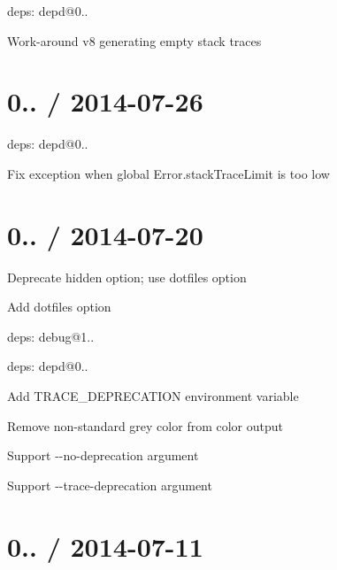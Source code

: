 \begin{DoxyItemize}
\item deps\+: depd@0..
\begin{DoxyItemize}
\item Work-\/around v8 generating empty stack traces
\end{DoxyItemize}
\end{DoxyItemize}

\section*{0.. / 2014-\/07-\/26 }


\begin{DoxyItemize}
\item deps\+: depd@0..
\begin{DoxyItemize}
\item Fix exception when global {\ttfamily Error.\+stack\+Trace\+Limit} is too low
\end{DoxyItemize}
\end{DoxyItemize}

\section*{0.. / 2014-\/07-\/20 }


\begin{DoxyItemize}
\item Deprecate {\ttfamily hidden} option; use {\ttfamily dotfiles} option
\item Add {\ttfamily dotfiles} option
\item deps\+: debug@1..
\item deps\+: depd@0..
\begin{DoxyItemize}
\item Add {\ttfamily T\+R\+A\+C\+E\+\_\+\+D\+E\+P\+R\+E\+C\+A\+T\+I\+ON} environment variable
\item Remove non-\/standard grey color from color output
\item Support {\ttfamily -\/-\/no-\/deprecation} argument
\item Support {\ttfamily -\/-\/trace-\/deprecation} argument
\end{DoxyItemize}
\end{DoxyItemize}

\section*{0.. / 2014-\/07-\/11 }


